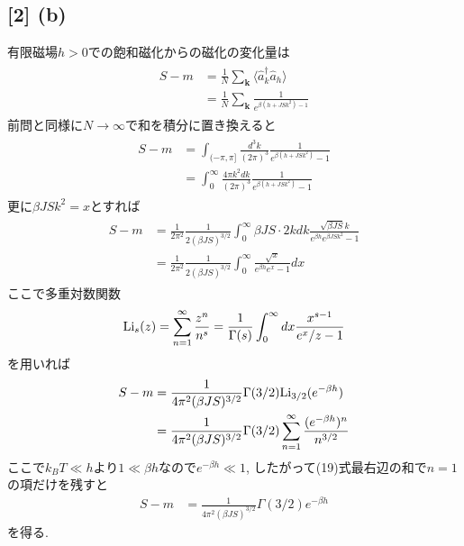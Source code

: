 \documentclass[uplatex,a4j,11pt,dvipdfmx]{jsarticle}
\begin{document}
\subsection*{[2] (b)}
有限磁場$h>0$での飽和磁化からの磁化の変化量は
\begin{align}
  \begin{split}
    S-m&=\frac{1}{N}\sum_{\bm k}\langle\hat{a}_k^\dagger\hat{a}_h\rangle\\
    &=\frac{1}{N}\sum_{\bm k}\frac{1}{e^{\beta(h+JSk^2)-1}}
  \end{split}
\end{align}
前問と同様に$N\rightarrow\infty$で和を積分に置き換えると
\begin{align}
  \begin{split}
    S-m&=\int_{(-\pi,\pi]}\frac{d^3k}{(2\pi)^3}\frac{1}{e^{\beta(h+JSk^2)}-1}\\
    &=\int_0^\infty\frac{4\pi k^2dk}{(2\pi)^3}\frac{1}{e^{\beta(h+JSk^2)}-1}
  \end{split}
\end{align}
更に$\beta JSk^2=x$とすれば
\begin{align}
  \begin{split}
    S-m&=\frac{1}{2\pi^2}\frac{1}{2(\beta JS)^{3/2}}\int_0^\infty \beta JS\cdot2kdk\frac{\sqrt{\beta JS}k}{e^{\beta h}e^{\beta JSk^2}-1}\\
    &=\frac{1}{2\pi^2}\frac{1}{2(\beta JS)^{3/2}}\int_0^\infty \frac{\sqrt{x}}{e^{\beta h}e^x-1}dx
  \end{split}
\end{align}
ここで多重対数関数
\begin{align}
  {\rm Li}_s(z)=\sum_{n=1}^\infty\frac{z^n}{n^s}=\frac{1}{\Gamma(s)}\int_0^\infty dx\frac{x^{s-1}}{e^x/z-1}
\end{align}
を用いれば
\begin{align}
  \begin{split}
    S-m&=\frac{1}{4\pi^2(\beta JS)^{3/2}}\Gamma(3/2){\rm Li}_{3/2}(e^{-\beta h})\\
    &=\frac{1}{4\pi^2(\beta JS)^{3/2}}\Gamma(3/2)\sum_{n=1}^\infty\frac{(e^{-\beta h})^n}{n^{3/2}}
  \end{split}
\end{align}
ここで$k_BT\ll h$より$1\ll \beta h$なので$e^{-\beta h}\ll 1$, したがって(19)式最右辺の和で$n=1$の項だけを残すと
\begin{align}
  S-m&=\frac{1}{4\pi^2(\beta JS)^{3/2}}\Gamma(3/2)e^{-\beta h}
\end{align}
を得る.
\end{document}
